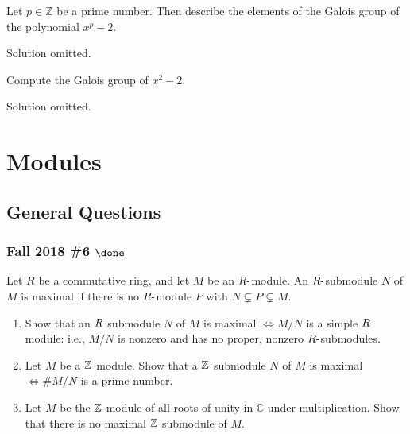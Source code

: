 \begin{exercise}[?]

Let \(p \in \mathbb{Z}\) be a prime number. Then describe the elements
of the Galois group of the polynomial \(x^{p}-2\).

\end{exercise}

Solution omitted.

\begin{exercise}[?]

Compute the Galois group of \(x^2-2\).

\end{exercise}

Solution omitted.

\hypertarget{modules}{%
\section{Modules}\label{modules}}

\hypertarget{general-questions}{%
\subsection{General Questions}\label{general-questions}}

\hypertarget{fall-2018-6-done}{%
\subsubsection{\texorpdfstring{Fall 2018 \#6
\(\done\)}{Fall 2018 \#6 \textbackslash done}}\label{fall-2018-6-done}}

Let \(R\) be a commutative ring, and let \(M\) be an
\(R{\hbox{-}}\)module. An \(R{\hbox{-}}\)submodule \(N\) of \(M\) is
maximal if there is no \(R{\hbox{-}}\)module \(P\) with
\(N \subsetneq P \subsetneq M\).

\begin{enumerate}
\def\labelenumi{\alph{enumi}.}
\item
  Show that an \(R{\hbox{-}}\)submodule \(N\) of \(M\) is maximal
  \(\iff M /N\) is a simple \(R{\hbox{-}}\)module: i.e., \(M /N\) is
  nonzero and has no proper, nonzero \(R{\hbox{-}}\)submodules.
\item
  Let \(M\) be a \({\mathbb{Z}}{\hbox{-}}\)module. Show that a
  \({\mathbb{Z}}{\hbox{-}}\)submodule \(N\) of \(M\) is maximal
  \(\iff \#M /N\) is a prime number.
\item
  Let \(M\) be the \({\mathbb{Z}}{\hbox{-}}\)module of all roots of
  unity in \({\mathbb{C}}\) under multiplication. Show that there is no
  maximal \({\mathbb{Z}}{\hbox{-}}\)submodule of \(M\).
\end{enumerate}

